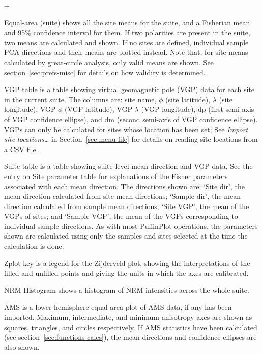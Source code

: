 \documentclass[a4paper,british]{article}
\newcommand{\menuitemlabel}[1]{%
\mbox{\textsf{#1}}\hfil}
\newenvironment{menuitemlist}%
{\begin{list}{}{%
\renewcommand{\makelabel}{\menuitemlabel}%
\setlength{\labelwidth}{35pt}%
\setlength{\leftmargin}%
             {\labelwidth+\labelsep}}}%
{\end{list}}
\newcommand{\ppcmd}[1]{\textsf{#1}} %
\newcommand{\caps}[1]{\MakeTextUppercase{#1}} %
\begin{document}
\begin{menuitemlist}
\item[Equal-area (suite)] shows all the site means for the suite, and a
  Fisherian mean and 95\% confidence interval for them. If two polarities are
  present in the suite, two means are calculated and shown. If no sites
  are defined, individual sample \caps{pca} directions and their means
  are plotted instead. Note that, for site means calculated by great-circle
  analysis, only valid means are shown. See section~\ref{sec:prefs-misc}
  for details on how validity is determined.

\item[VGP table] is a table showing virtual geomagnetic pole (VGP) data
  for each site in the current suite. The columns are: site name, $\phi$
  (site latitude), $\lambda$ (site longitude), VGP $\phi$ (VGP
  latitude), VGP $\lambda$ (VGP longitude), dp (first semi-axis of VGP
  confidence ellipse), and dm (second semi-axis of VGP confidence
  ellipse). VGPs can only be calculated for sites whose location has
  been set; See \emph{Import site locations\ldots} in
  Section~\ref{sec:menu-file} for details on reading site locations from
  a \caps{csv} file.

\item[Suite table] is a table showing suite-level mean direction and VGP
  data. See the entry on \ppcmd{Site parameter table} for explanations
  of the Fisher parameters associated with each mean direction. The
  directions shown are: `Site dir', the mean direction calculated from
  site mean directions; `Sample dir', the mean direction calculated from
  sample mean directions; `Site VGP', the mean of the VGPs of sites; and
  `Sample VGP', the mean of the VGPs corresponding to individual sample
  directions. As with most PuffinPlot operations, the parameters shown
  are calculated using only the samples and sites selected at the time
  the calculation is done.

\item[Zplot key] is a legend for the Zijderveld plot, showing the
  interpretations of the filled and unfilled points and giving the units in
  which the axes are calibrated.

\item[\caps{Nrm} Histogram] shows a histogram of \caps{nrm} intensities
  across the whole suite.

\item[\caps{Ams}] is a lower-hemisphere equal-area plot of \caps{ams} data,
  if any has been imported. Maximum, intermediate, and minimum anisotropy
  axes are shown as squares, triangles, and circles respectively. If
  \caps{ams} statistics have been calculated (see
  section~\ref{sec:functions-calcs}), the mean directions and confidence
  ellipses are also shown.


\end{menuitemlist}
\end{document}

